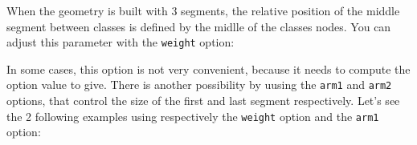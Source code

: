 \documentclass[a4paper,11pt]{report}
\begin{document}
\medskip

\begin{minipage}{0.5\textwidth}
	
\end{minipage}
\begin{minipage}{0.4\textwidth}
	\begin{center}
	\end{center}
\end{minipage}

\medskip

When the geometry is built with 3 segments, the relative position of the middle segment between classes is defined by the midlle of the classes nodes. You can adjust this parameter with the \hypertarget{weight}{{\tt weight}} option:

\medskip

\begin{minipage}{0.5\textwidth}
	
\end{minipage}
\begin{minipage}{0.4\textwidth}
	\begin{center}
	\end{center}
\end{minipage}

In some cases, this option is not very convenient, because it needs to compute the option value to give.
There is another possibility by uusing the  \hypertarget{arm1}{{\tt arm1}} and  \hypertarget{arm2}{{\tt arm2}} options, that control the size
of the first and last segment respectively. Let's see the 2 following examples using respectively the {\tt weight} option and the {\tt arm1} option:

\medskip

\begin{minipage}{0.5\textwidth}
	
\end{minipage}
\begin{minipage}{0.4\textwidth}
	\begin{center}
	\end{center}
\end{minipage}

\medskip

\begin{minipage}{0.5\textwidth}
	
\end{minipage}
\begin{minipage}{0.4\textwidth}
	\begin{center}
	\end{center}
\end{minipage}
\end{document}

